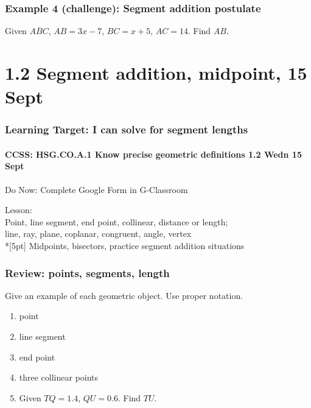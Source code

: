 \documentclass{beamer}
\begin{document}
  \frame
  {
    \frametitle{Example 4 (challenge): Segment addition postulate}
    
    Given $\overline{ABC}$, $AB=3x-7$, $BC=x+5$, $AC=14$. Find ${AB}$.\\[0.5in]
        \vspace{1cm}
  }

  \section{1.2 Segment addition, midpoint, 15 Sept}
  \frame
  {
    \frametitle{Learning Target: I can solve for segment lengths}
    \framesubtitle{CCSS: HSG.CO.A.1 Know precise geometric definitions  \hfill \alert{1.2 Wedn 15 Sept}}
  
    \begin{block}{Do Now: Complete Google Form in G-Classroom}
    \end{block}
    Lesson: \\ Point, line segment, end point, collinear, distance or length; \\ line, ray, plane, coplanar, congruent, angle, vertex \\*[5pt]
    Midpoints, bisectors, practice segment addition situations
  }

  \frame
  {
    \frametitle{Review: points, segments, length}
    Give an example of each geometric object. Use proper notation.
    \begin{enumerate}
      \item point
      \item line segment
      \item end point
      \item three collinear points
      \item Given $TQ=1.4$, $QU=0.6$. Find $TU$.
    \end{enumerate}
  }
\end{document}
